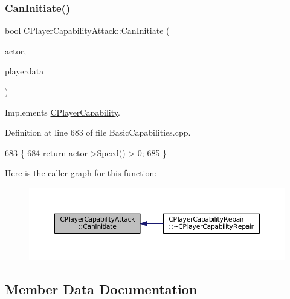 \subsubsection{\texorpdfstring{Can\+Initiate()}{CanInitiate()}}
{\footnotesize\ttfamily bool C\+Player\+Capability\+Attack\+::\+Can\+Initiate (\begin{DoxyParamCaption}\item[{std\+::shared\+\_\+ptr$<$ \hyperlink{classCPlayerAsset}{C\+Player\+Asset} $>$}]{actor,  }\item[{std\+::shared\+\_\+ptr$<$ \hyperlink{classCPlayerData}{C\+Player\+Data} $>$}]{playerdata }\end{DoxyParamCaption})\hspace{0.3cm}{\ttfamily [virtual]}}



Implements \hyperlink{classCPlayerCapability_aa83b1e1fcaff2985c378132d679154ea}{C\+Player\+Capability}.



Definition at line 683 of file Basic\+Capabilities.\+cpp.


\begin{DoxyCode}
683                                                                                                            
                \{
684     \textcolor{keywordflow}{return} actor->Speed() > 0;
685 \}
\end{DoxyCode}
Here is the caller graph for this function\+:\nopagebreak
\begin{figure}[H]
\begin{center}
\leavevmode
\includegraphics[width=350pt]{classCPlayerCapabilityAttack_ab1cda67a8e637a90accf03d1581d4072_icgraph}
\end{center}
\end{figure}


\subsection{Member Data Documentation}
\hypertarget{classCPlayerCapabilityAttack_a22b5c69229cdc25c3f289de947db148d}{}\label{classCPlayerCapabilityAttack_a22b5c69229cdc25c3f289de947db148d} 

